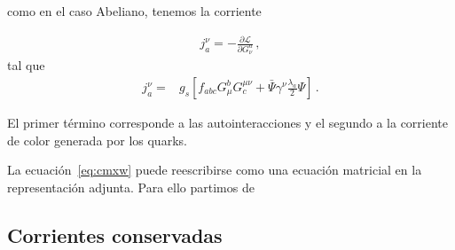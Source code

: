 como en el caso Abeliano, tenemos la corriente
\begin{frame}
\begin{align}
  \label{eq:noabeljnu}
j^{\nu}_{a}=-\frac{\partial\mathcal{L}}{\partial G_\nu^a}\,,
\end{align}
tal que
\begin{align}
\label{eq:jnuqcd}
  j^\nu_a=&g_s\left[f_{abc}G^b_\mu G^{\mu\nu}_c+\bar{\Psi}\gamma^\nu\frac{\lambda_a}{2}\Psi  \right]\,.
\end{align}

El primer término corresponde a las autointeracciones y el segundo a la corriente de color generada por los quarks.
\end{frame}

La ecuación~\eqref{eq:cmxw} puede reescribirse como una ecuación matricial en la representación adjunta. Para ello partimos de


\subsection{Corrientes conservadas}

